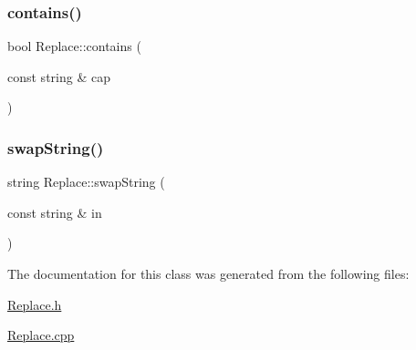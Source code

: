 \mbox{\label{class_replace_abcd8feb318330bd5eef71fcc287f31dc}} 
\subsubsection{\texorpdfstring{contains()}{contains()}}
{\footnotesize\ttfamily bool Replace\+::contains (\begin{DoxyParamCaption}\item[{const string \&}]{cap }\end{DoxyParamCaption})}

\mbox{\label{class_replace_a464d1037d9780790052685f2e30c58c0}} 
\subsubsection{\texorpdfstring{swap\+String()}{swapString()}}
{\footnotesize\ttfamily string Replace\+::swap\+String (\begin{DoxyParamCaption}\item[{const string \&}]{in }\end{DoxyParamCaption})}



The documentation for this class was generated from the following files\+:\begin{DoxyCompactItemize}
\item 
\hyperlink{_replace_8h}{Replace.\+h}\item 
\hyperlink{_replace_8cpp}{Replace.\+cpp}\end{DoxyCompactItemize}
